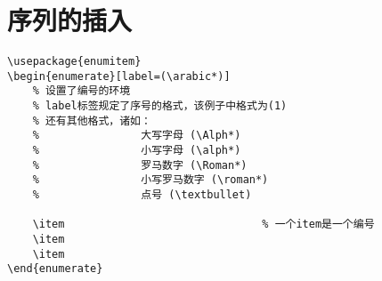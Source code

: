 \part{序列的插入}
\begin{lstlisting}[style = LaTeX_TeXworks]
\usepackage{enumitem}
\begin{enumerate}[label=(\arabic*)]		
	% 设置了编号的环境
	% label标签规定了序号的格式，该例子中格式为(1)
	% 还有其他格式，诸如：
	% 				 大写字母 (\Alph*)
	% 				 小写字母 (\alph*)
	% 				 罗马数字 (\Roman*)
	% 				 小写罗马数字 (\roman*)
	% 				 点号 (\textbullet)
	
	\item								% 一个item是一个编号
	\item
	\item
\end{enumerate}
\end{lstlisting}